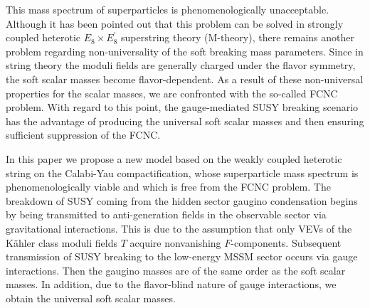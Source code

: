 This mass spectrum of superparticles is phenomenologically 
unacceptable. 
Although it has been pointed out that this problem can be solved 
in strongly coupled heterotic $E_{8}\times E^{\prime}_{8}$ 
superstring theory (M-theory)\cite{H-W}\cite{problem}, 
there remains another problem regarding non-universality of the soft 
breaking mass parameters. 
Since in string theory the moduli fields are generally 
charged under the flavor symmetry, 
the soft scalar masses become flavor-dependent. 
As a result of these non-universal properties for the scalar masses, 
we are confronted with the so-called FCNC problem. 
With regard to this point, the gauge-mediated SUSY breaking scenario 
has the advantage of producing the universal soft scalar masses and 
then ensuring sufficient suppression of the FCNC. 

In this paper we propose a new model based on the weakly coupled 
heterotic string on the Calabi-Yau compactification, 
whose superparticle mass spectrum is phenomenologically 
viable and which is free from the FCNC problem. 
The breakdown of SUSY coming from the hidden sector gaugino condensation 
begins by being transmitted to anti-generation fields in the observable 
sector via gravitational interactions. 
This is due to the assumption that only VEVs of the K\"ahler 
class moduli fields $T$ acquire nonvanishing $F$-components. 
Subsequent transmission of SUSY breaking to the low-energy 
MSSM sector occurs via gauge interactions. 
Then the gaugino masses are of the same order as the soft scalar masses. 
In addition, due to the flavor-blind nature of gauge interactions, 
we obtain the universal soft scalar masses. 

